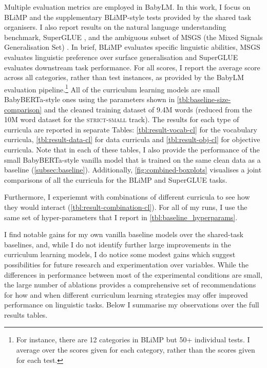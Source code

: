 Multiple evaluation metrics are employed in BabyLM. In this work, I focus on BLiMP \citep{warstadt2020blimp} and the supplementary BLiMP-style tests provided by the shared task organisers. I also report results on the natural language understanding benchmark, SuperGLUE \citep{wang2019superglue}, and the ambiguous subset of MSGS (the Mixed Signals Generalisation Set) \citep{warstadt2020msgs}. In brief, BLiMP evaluates specific linguistic abilities, MSGS evaluates linguistic preference over surface generalisation and SuperGLUE evaluates downstream task performance. For all scores, I report the average score across all categories, rather than test instances, as provided by the BabyLM evaluation pipeline.\footnote{For instance, there are 12 categories in BLiMP but 50+ individual tests. I average over the scores given for each category, rather than the scores given for each test.} All of the curriculum learning models are small BabyBERTa-style ones using the parameters shown in \cref{tbl:baseline-size-comparison} and the cleaned training dataset of 9.4M words (reduced from the 10M word dataset for the \textsc{strict-small} track). The results for each type of curricula are reported in separate Tables: \cref{tbl:result-vocab-cl} for the vocabulary curricula, \cref{tbl:result-data-cl} for data curricula and \cref{tbl:result-obj-cl} for objective curricula. Note that in each of these tables, I also provide the performance of the small BabyBERTa-style vanilla model that is trained on the same clean data as a baseline (\cref{subsec:baseline}). Additionally, \cref{fig:combined-boxplots} visualises a joint comparisons of all the curricula for the BLiMP and SuperGLUE tasks.

Furthermore, I experiemnt with combinations of different curricula to see how they would interact (\cref{tbl:result-combination-cl}). For all of my runs, I use the same set of hyper-parameters that I report in \cref{tbl:baseline_hyperparams}. 

I find notable gains for my own vanilla baseline models over the shared-task baselines, and, while I do not identify further large improvements in the curriculum learning models, I do notice some modest gains which suggest possibilities for future research and experimentation over variables. While the differences in performance between most of the experimental conditions are small, the large number of ablations provides a comprehensive set of recommendations for how and when different curriculum learning strategies may offer improved performance on linguistic tasks. Below I summarise my observations over the full results tables.

